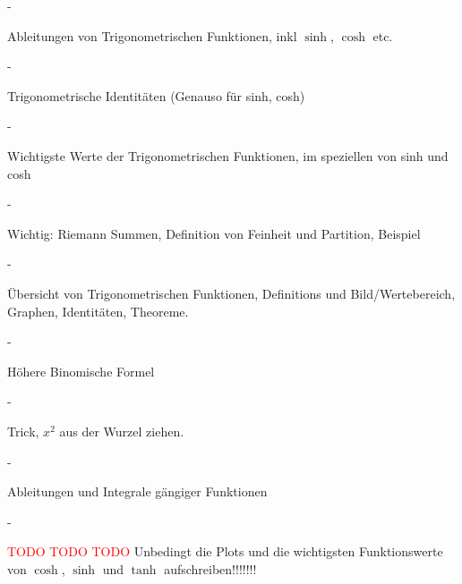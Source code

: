 \documentclass[a4paper,landscape,8pt]{extarticle}
\newcommand{\todo}{\textcolor{red}{TODO }}
\begin{document}
\begin{multicols*}{4}
\begin{warmup}
-

Ableitungen von Trigonometrischen Funktionen, inkl $\sinh$, $\cosh$ etc.

- 

Trigonometrische Identitäten  (Genauso für sinh, cosh)

-

Wichtigste Werte der Trigonometrischen Funktionen, im speziellen von sinh und
cosh

-

Wichtig: Riemann Summen, Definition von Feinheit und Partition, Beispiel

-

Übersicht von Trigonometrischen Funktionen,
Definitions und Bild/Wertebereich, Graphen, Identitäten, Theoreme.

-

Höhere Binomische Formel

-

Trick, $x^2$ aus der Wurzel ziehen.

-

Ableitungen und Integrale gängiger Funktionen

-

\todo \todo \todo Unbedingt die Plots und die wichtigsten Funktionswerte von
$\cosh$, $\sinh$ und $\tanh$ aufschreiben!!!!!!!

\end{warmup}

\end{multicols*}
\end{document}
